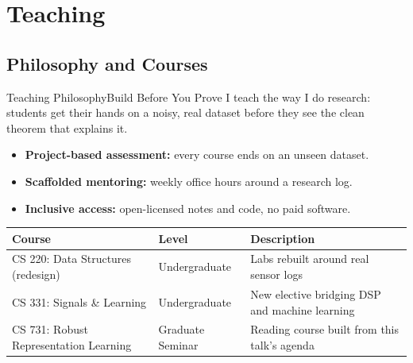 \section{Teaching}
\subsection{Philosophy and Courses}

\begin{frame}{Teaching Philosophy}{Build Before You Prove}
  \small
  I teach the way I do research: students get their hands on a noisy, real
  dataset before they see the clean theorem that explains it.

  \begin{itemize}
    \item \textbf{Project-based assessment:} every course ends on an unseen dataset.
    \item \textbf{Scaffolded mentoring:} weekly office hours around a research log.
    \item \textbf{Inclusive access:} open-licensed notes and code, no paid software.
  \end{itemize}

  \vspace{0.05cm}
  \begin{center}
  \renewcommand{\arraystretch}{0.9}
  {\scriptsize
  \begin{tabular}{>{\raggedright\arraybackslash}p{4.0cm} >{\raggedright\arraybackslash}p{2.2cm} >{\raggedright\arraybackslash}p{5.0cm}}
    \toprule
    \textbf{Course} & \textbf{Level} & \textbf{Description} \\
    \midrule
    CS 220: Data Structures (redesign) & Undergraduate & Labs rebuilt around real sensor logs \\
    CS 331: Signals \& Learning & Undergraduate & New elective bridging DSP and machine learning \\
    CS 731: Robust Representation Learning & Graduate Seminar & Reading course built from this talk's agenda \\
    \bottomrule
  \end{tabular}
  }
  \end{center}
\end{frame}
